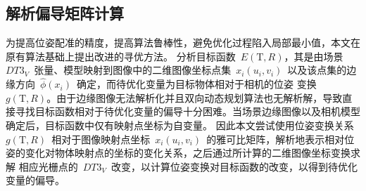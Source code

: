 \subsection{解析偏导矩阵计算}
\label{sec:Matrix calculation}
为提高位姿配准的精度，提高算法鲁棒性，避免优化过程陷入局部最小值，本文在原有算法基础上提出改进的寻优方法。
分析目标函数~$E(\textrm{T},R)$，其是由场景~$DT3_V$~张量、模型映射到图像中的二维图像坐标点集~$x_i(u_i,v_i)$~以及该点集的边缘方向~$\hat \phi (x_i)$~确定，而待优化变量为目标物体相对于相机的位姿
变换~$g(\textrm{T},R)$。由于边缘图像无法解析化并且双向动态规划算法也无解析解，导致直接寻找目标函数相对于待优化变量的偏导十分困难。当场景边缘图像以及相机模型确定后，目标函数中仅有映射点坐标为自变量。
因此本文尝试使用位姿变换关系~$g(\textrm{T},R)$~相对于图像映射点坐标~$x_i(u_i,v_i)$~的雅可比矩阵，解析地表示相对位姿的变化对物体映射点的坐标的变化关系，之后通过所计算的二维图像坐标变换求解
相应光栅点的~$DT3_V$~改变，以计算位姿变换对目标函数的改变，以得到待优化变量的偏导。

